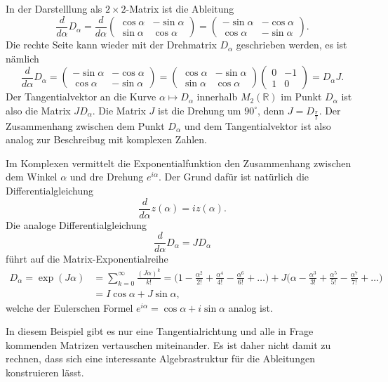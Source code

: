 In der Darstelllung als $2\times 2$-Matrix ist die Ableitung
\[
\frac{d}{d\alpha}D_\alpha
=
\frac{d}{d\alpha}
\begin{pmatrix}
\cos\alpha& -\sin\alpha\\
\sin\alpha&  \cos\alpha
\end{pmatrix}
=
\begin{pmatrix}
-\sin\alpha & -\cos\alpha \\
 \cos\alpha & -\sin\alpha
\end{pmatrix}.
\]
Die rechte Seite kann wieder mit der Drehmatrix $D_\alpha$ geschrieben
werden, es ist nämlich
\[
\frac{d}{d\alpha}D_\alpha
=
\begin{pmatrix}
-\sin\alpha & -\cos\alpha \\
 \cos\alpha & -\sin\alpha
\end{pmatrix}
=
\begin{pmatrix}
\cos\alpha & -\sin\alpha\\
\sin\alpha &  \cos\alpha
\end{pmatrix}
\begin{pmatrix}
0&-1\\
1& 0
\end{pmatrix}
=
D_\alpha J.
\]
Der Tangentialvektor an die Kurve $\alpha\mapsto D_\alpha$ innerhalb
$M_2(\mathbb{R})$ im Punkt $D_\alpha$ ist also die Matrix 
$JD_\alpha$.
Die Matrix $J$ ist die Drehung um $90^\circ$, denn $J=D_{\frac{\pi}2}$.
Der Zusammenhang zwischen dem Punkt $D_\alpha$ und dem Tangentialvektor
ist also analog zur Beschreibug mit komplexen Zahlen.

Im Komplexen vermittelt die Exponentialfunktion den Zusammenhang zwischen
dem Winkel $\alpha$ und dre Drehung $e^{i\alpha}$.
Der Grund dafür ist natürlich die Differentialgleichung
\[
\frac{d}{d\alpha} z(\alpha) =  iz(\alpha).
\]
Die analoge Differentialgleichung 
\[
\frac{d}{d\alpha} D_\alpha = J D_\alpha
\]
führt auf die Matrix-Exponentialreihe
\begin{align*}
D_\alpha
=
\exp (J\alpha)
&=
\sum_{k=0}^\infty \frac{(J\alpha)^k}{k!}
=
\biggl(
1-\frac{\alpha^2}{2!} + \frac{\alpha^4}{4!} -\frac{\alpha^6}{6!}+\dots
\biggr)
+
J\biggl(
\alpha - \frac{\alpha^3}{3!}
+ \frac{\alpha^5}{5!}
- \frac{\alpha^7}{7!}+\dots
\biggr)
\\
&=
I\cos\alpha
+
J\sin\alpha,
\end{align*}
welche der Eulerschen Formel $e^{i\alpha} = \cos\alpha + i \sin\alpha$
analog ist.

In diesem Beispiel gibt es nur eine Tangentialrichtung und alle in Frage
kommenden Matrizen vertauschen miteinander.
Es ist daher nicht damit zu rechnen, dass sich eine interessante 
Algebrastruktur für die Ableitungen konstruieren lässt.

